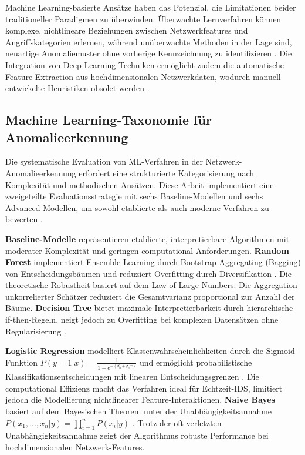\documentclass[11pt,a4paper]{article}
\begin{document}
    Machine Learning-basierte Ansätze haben das Potenzial, die Limitationen beider traditioneller Paradigmen zu überwinden. Überwachte Lernverfahren können komplexe, nichtlineare Beziehungen zwischen Netzwerkfeatures und Angriffskategorien erlernen, während unüberwachte Methoden in der Lage sind, neuartige Anomaliemuster ohne vorherige Kennzeichnung zu identifizieren \parencite{Vinayakumar2019}. Die Integration von Deep Learning-Techniken ermöglicht zudem die automatische Feature-Extraction aus hochdimensionalen Netzwerkdaten, wodurch manuell entwickelte Heuristiken obsolet werden \parencite{Goodfellow2016}.

    \subsection{Machine Learning-Taxonomie für Anomalieerkennung}

    Die systematische Evaluation von ML-Verfahren in der Netzwerk-Anomalieerkennung erfordert eine strukturierte Kategorisierung nach Komplexität und methodischen Ansätzen. Diese Arbeit implementiert eine zweigeteilte Evaluationsstrategie mit sechs Baseline-Modellen und sechs Advanced-Modellen, um sowohl etablierte als auch moderne Verfahren zu bewerten \parencite{Vinayakumar2019}.

    \textbf{Baseline-Modelle} repräsentieren etablierte, interpretierbare Algorithmen mit moderater Komplexität und geringen computational Anforderungen. \textbf{Random Forest} implementiert Ensemble-Learning durch Bootstrap Aggregating (Bagging) von Entscheidungsbäumen und reduziert Overfitting durch Diversifikation \parencite{Hastie2009}. Die theoretische Robustheit basiert auf dem Law of Large Numbers: Die Aggregation unkorrelierter Schätzer reduziert die Gesamtvarianz proportional zur Anzahl der Bäume. \textbf{Decision Tree} bietet maximale Interpretierbarkeit durch hierarchische if-then-Regeln, neigt jedoch zu Overfitting bei komplexen Datensätzen ohne Regularisierung \parencite{Hastie2009}.

    \textbf{Logistic Regression} modelliert Klassenwahrscheinlichkeiten durch die Sigmoid-Funktion $P(y=1|x) = \frac{1}{1+e^{-(\beta_0 + \beta_1 x)}}$ und ermöglicht probabilistische Klassifikationsentscheidungen mit linearen Entscheidungsgrenzen \parencite{Bishop2006}. Die computational Effizienz macht das Verfahren ideal für Echtzeit-IDS, limitiert jedoch die Modellierung nichtlinearer Feature-Interaktionen. \textbf{Naive Bayes} basiert auf dem Bayes'schen Theorem unter der Unabhängigkeitsannahme $P(x_1,...,x_n|y) = \prod_{i=1}^{n} P(x_i|y)$ \parencite{Bishop2006}. Trotz der oft verletzten Unabhängigkeitsannahme zeigt der Algorithmus robuste Performance bei hochdimensionalen Netzwerk-Features.
\end{document}
